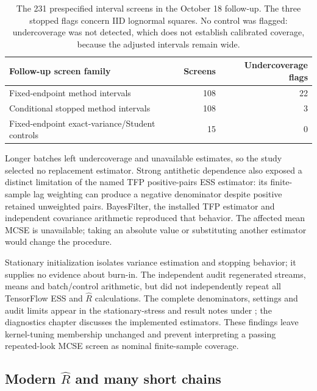 \begin{table}[htbp]
\centering\small
\begin{tabular}{lrr}
\toprule
Follow-up screen family & Screens & Undercoverage flags\\
\midrule
Fixed-endpoint method intervals & 108 & 22\\
Conditional stopped method intervals & 108 & 3\\
Fixed-endpoint exact-variance/Student controls & 15 & 0\\
\bottomrule
\end{tabular}
\caption{The 231 prespecified interval screens in the October 18 follow-up.
The three stopped flags concern IID lognormal squares. No control was flagged:
undercoverage was not detected, which does not establish calibrated
coverage, because the adjusted intervals remain wide.}
\label{tab:bf-modern-intervals}
\end{table}

Longer batches left undercoverage and unavailable estimates, so the study
selected no replacement estimator. Strong antithetic dependence also exposed
a distinct limitation of the named TFP positive-pairs ESS estimator: its
finite-sample lag weighting can produce a negative denominator despite
positive retained unweighted pairs. BayesFilter, the installed TFP estimator
and independent covariance arithmetic reproduced that behavior. The affected
mean MCSE is unavailable; taking an absolute value or substituting another
estimator would change the procedure.

Stationary initialization isolates variance estimation and stopping behavior;
it supplies no evidence about burn-in. The independent audit regenerated
streams, means and batch/control arithmetic, but did not independently repeat
all TensorFlow ESS and $\widehat R$ calculations. The complete denominators,
settings and audit limits appear in the stationary-stress and
 result notes
under ; the diagnostics chapter discusses the implemented
estimators. These findings leave kernel-tuning membership unchanged and
prevent interpreting a passing repeated-look MCSE screen as nominal
finite-sample coverage.

\subsection{Modern \texorpdfstring{$\widehat R$}{R-hat} and many short chains}

